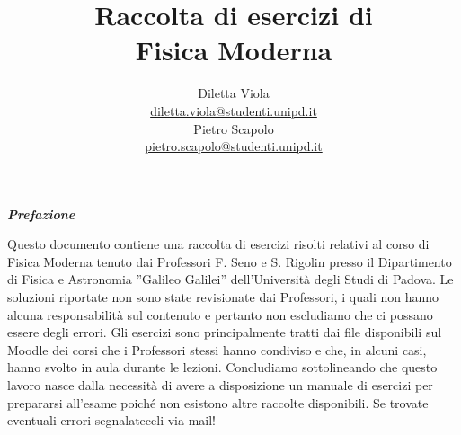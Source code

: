 \documentclass[12pt,twoside,a4]{article}
\begin{document}
\setlength{\headheight}{15.2pt}

\title{Raccolta di esercizi di \\Fisica Moderna}
\author{Diletta Viola \\ \small{\href{mailto:\\ diletta.viola@studenti.unipd.it}{diletta.viola@studenti.unipd.it}}\\ \Large Pietro Scapolo \\ \small{\href{mailto:\\ pietro.scapolo@studenti.unipd.it}{pietro.scapolo@studenti.unipd.it}}}
\maketitle[toc=off]
\pagestyle{empty}
\vspace*{\fill} 
\begin{center}
    \textit{\textbf{ \Huge Prefazione}}
\end{center}
    \begin{adjustwidth}{0.15\textwidth}{0.15\textwidth}
    \begin{center}
    Questo documento contiene una raccolta di esercizi risolti relativi al corso di Fisica Moderna tenuto dai Professori F. Seno e S. Rigolin presso il Dipartimento di Fisica e Astronomia ”Galileo Galilei” dell'Università degli Studi di Padova. Le soluzioni riportate non sono state revisionate dai Professori, i quali non hanno alcuna responsabilità sul contenuto e pertanto non escludiamo che ci possano essere degli errori. Gli esercizi sono principalmente tratti dai file disponibili sul Moodle dei corsi che i Professori stessi hanno condiviso e che, in alcuni casi, hanno svolto in aula durante le lezioni. 
    Concludiamo sottolineando che questo lavoro nasce dalla necessità di avere a disposizione un manuale di esercizi per prepararsi all'esame poiché non esistono altre raccolte disponibili.
    Se trovate eventuali errori segnalateceli via mail!
    \end{center}
    \end{adjustwidth}


\setcounter{tocdepth}{2}

\vspace*{\fill} 
\pagestyle{empty}
\vspace*{\fill}
\tableofcontents 
\vspace*{\fill}


\pagestyle{thesis}
\end{document}
